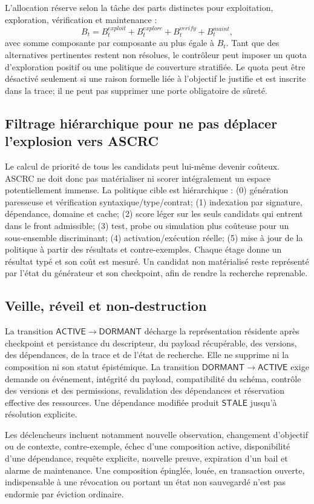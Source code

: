 \documentclass[11pt,a4paper]{article}
\theoremstyle{definition}
\theoremstyle{plain}
\theoremstyle{remark}
\begin{document}
L'allocation réserve selon la tâche des parts distinctes pour exploitation, exploration, vérification et maintenance :
\[
 B_t=B_t^{exploit}+B_t^{explore}+B_t^{verify}+B_t^{maint},
\]
avec somme composante par composante au plus égale à $B_t$. Tant que des alternatives pertinentes restent non résolues, le contrôleur peut imposer un quota d'exploration positif ou une politique de couverture stratifiée. Le quota peut être désactivé seulement si une raison formelle liée à l'objectif le justifie et est inscrite dans la trace; il ne peut pas supprimer une porte obligatoire de sûreté.

\subsection{Filtrage hiérarchique pour ne pas déplacer l'explosion vers ASCRC}
Le calcul de priorité de tous les candidats peut lui-même devenir coûteux. ASCRC ne doit donc pas matérialiser ni scorer intégralement un espace potentiellement immense. La politique cible est hiérarchique : (0) génération paresseuse et vérification syntaxique/type/contrat; (1) indexation par signature, dépendance, domaine et cache; (2) score léger sur les seuls candidats qui entrent dans le front admissible; (3) test, probe ou simulation plus coûteuse pour un sous-ensemble discriminant; (4) activation/exécution réelle; (5) mise à jour de la politique à partir des résultats et contre-exemples. Chaque étage donne un résultat typé et son coût est mesuré. Un candidat non matérialisé reste représenté par l'état du générateur et son checkpoint, afin de rendre la recherche reprenable.

\subsection{Veille, réveil et non-destruction}
La transition $\mathsf{ACTIVE}\to\mathsf{DORMANT}$ décharge la représentation résidente après checkpoint et persistance du descripteur, du payload récupérable, des versions, des dépendances, de la trace et de l'état de recherche. Elle ne supprime ni la composition ni son statut épistémique. La transition $\mathsf{DORMANT}\to\mathsf{ACTIVE}$ exige demande ou événement, intégrité du payload, compatibilité du schéma, contrôle des versions et des permissions, revalidation des dépendances et réservation effective des ressources. Une dépendance modifiée produit $\mathsf{STALE}$ jusqu'à résolution explicite.

Les déclencheurs incluent notamment nouvelle observation, changement d'objectif ou de contexte, contre-exemple, échec d'une composition active, disponibilité d'une dépendance, requête explicite, nouvelle preuve, expiration d'un bail et alarme de maintenance. Une composition épinglée, louée, en transaction ouverte, indispensable à une révocation ou portant un état non sauvegardé n'est pas endormie par éviction ordinaire.
\end{document}
